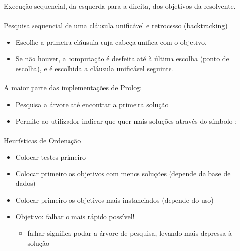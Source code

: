 \documentclass[../resumosPLOG.tex]{subfiles}
\begin{document}
 

Execução sequencial, da esquerda para a direita, dos objetivos da resolvente.

\paragraph{}

Pesquisa sequencial de uma cláusula unificável e retrocesso (backtracking)
\begin{itemize}
    \item Escolhe a primeira cláusula cuja cabeça unifica com o objetivo.
    \item Se não houver, a computação é desfeita até à última escolha (ponto de escolha), e é escolhida a cláusula unificável seguinte.
\end{itemize}

\paragraph{}

A maior parte das implementações de Prolog:
\begin{itemize}
    \item Pesquisa a árvore até encontrar a primeira solução
    \item Permite ao utilizador indicar que quer mais soluções através do símbolo ; 
\end{itemize}

\paragraph{}

Heurísticas de Ordenação
\begin{itemize}
    \item Colocar testes primeiro
    \item Colocar primeiro os objetivos com menos soluções (depende da base de dados)
    \item Colocar primeiro os objetivos mais instanciados (depende do uso)
    \item Objetivo: falhar o mais rápido possível!
    \begin{itemize}
        \item falhar significa podar a árvore de pesquisa, levando mais depressa à solução
    \end{itemize}
\end{itemize}

\paragraph{}
\end{document}
